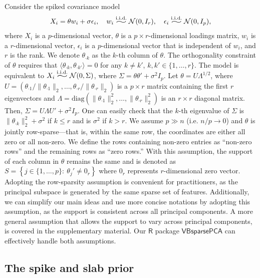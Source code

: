 \documentclass[pdftex, noinfoline, letter]{imsart}
\newcommand{\widesim}[2][2]{
	\mathrel{\overset{#2}{\scalebox{#1}[1]{$\sim$}}}
}
\theoremstyle{plain}
\begin{document}
Consider the spiked covariance model 
\begin{align}
X_i = \theta w_i + \sigma \epsilon_i, \quad
w_i \widesim{\text{i.i.d.}} \mathcal{N}(0, I_r), \quad
\epsilon_i \widesim{\text{i.i.d.}} \mathcal{N}(0, I_p),
\label{model}
\end{align}
where $X_i$ is a $p$-dimensional vector, $\theta$ is a $p \times r$-dimensional loadings matrix, 
$w_i$ is a $r$-dimensional vector, 
$\epsilon_i$ is a $p$-dimensional vector that is independent of $w_i$, and $r$ is the rank. We denote $\theta_{\cdot k}$ as the $k$-th column of $\theta$. 
The orthogonality constraint of $\theta$ requires that $\langle \theta_{\cdot k}, \theta_{\cdot k'} \rangle = 0$ for any $k \neq k'$, $k, k' \in \{1, \dots, r\}$. 
The model is equivalent to $X_i \widesim{\text{i.i.d.}} \mathcal{N}(0, \Sigma)$, where $\Sigma = \theta \theta' + \sigma^2 I_p$. 
Let $\theta = U\Lambda^{1/2}$, where 
$U = \left({\theta_{\cdot 1}}/{\|\theta_{\cdot 1}\|_2}, \dots, {\theta_{\cdot r}}/{\|\theta_{\cdot r}\|_2}\right)$ is a $p \times r$ matrix containing the first $r$ eigenvectors 
and $\Lambda = \text{diag}(\|\theta_{\cdot 1}\|_2^2, \dots, \|\theta_{\cdot r}\|_2^2)$ is an $r \times r$ diagonal matrix.
Then, $\Sigma = U\Lambda U' + \sigma^2 I_p$. One can easily check that the $k$-th eigenvalue of $\Sigma$ is $\|\theta_{\cdot k}\|_2^2 + \sigma^2$ if $k \leq r$ and is $\sigma^2$ if $k > r$.
We assume $p \gg n$ (i.e. $n/p \to 0$) and $\theta$ is jointly row-sparse---that is, within the same row, the coordinates are either all zero or all non-zero. 
We define the rows containing non-zero entries as ``non-zero rows'' and the remaining rows as ``zero rows.'' With this assumption, the support of each column in $\theta$ remains the same and is denoted as 
$S = \left\{j \in \{1, \dots, p\}: \ \theta_{j}' \neq 0_r \right\}$
where $0_r$ represents $r$-dimensional zero vector.
Adopting the row-sparsity assumption is convenient for practitioners, as the principal subspace is generated by the same sparse set of features. Additionally, we can simplify our main ideas and use more concise notations by adopting this assumption, as the support is consistent across all principal components. A more general assumption that allows the support to vary across principal components, is covered in the supplementary material. Our $\mathsf{R}$ package $\mathsf{VBsparsePCA}$ can effectively handle both assumptions.

\subsection{The spike and slab prior}
\label{sec:prior}
\end{document}
